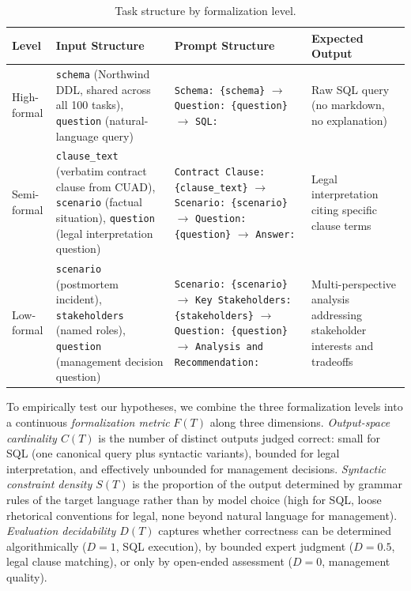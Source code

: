 \documentclass[runningheads]{llncs}
\begin{document}
\begin{table}[t]
\centering
\caption{Task structure by formalization level.}
\label{tab:task-structure}
\scriptsize
\begin{tabular}{
  >{\RaggedRight\arraybackslash}p{1.0cm}
  >{\RaggedRight\arraybackslash}p{4.2cm}
  >{\RaggedRight\arraybackslash}p{4.0cm}
  >{\RaggedRight\arraybackslash}p{2.5cm}
}
\toprule
Level & Input Structure & Prompt Structure & Expected Output \\
\midrule
High-formal &
  \texttt{schema} (Northwind DDL, shared across all 100 tasks), \texttt{question} (natural-language query) &
  \texttt{Schema: \{schema\}} $\rightarrow$ \texttt{Question: \{question\}} $\rightarrow$ \texttt{SQL:} &
  Raw SQL query (no markdown, no explanation) \\
\addlinespace
Semi-formal &
  \texttt{clause\_text} (verbatim contract clause from CUAD), \texttt{scenario} (factual situation), \texttt{question} (legal interpretation question) &
  \texttt{Contract Clause: \{clause\_text\}} $\rightarrow$ \texttt{Scenario: \{scenario\}} $\rightarrow$ \texttt{Question: \{question\}} $\rightarrow$ \texttt{Answer:} &
  Legal interpretation citing specific clause terms \\
\addlinespace
Low-formal &
  \texttt{scenario} (postmortem incident), \texttt{stakeholders} (named roles), \texttt{question} (management decision question) &
  \texttt{Scenario: \{scenario\}} $\rightarrow$ \texttt{Key Stakeholders: \{stakeholders\}} $\rightarrow$ \texttt{Question: \{question\}} $\rightarrow$ \texttt{Analysis and Recommendation:} &
  Multi-perspective analysis addressing stakeholder interests and tradeoffs \\
\bottomrule
\end{tabular}
\end{table}



To empirically test our hypotheses,
we combine the three formalization levels into a continuous \textit{formalization metric} $F(T)$ along three dimensions. \textit{Output-space cardinality $C(T)$} is the number of distinct outputs judged correct: small for SQL (one canonical query plus syntactic variants), bounded for legal interpretation, and effectively unbounded for management decisions. \textit{Syntactic constraint density $S(T)$} is the proportion of the output determined by grammar rules of the target language rather than by model choice (high for SQL, loose rhetorical conventions for legal, none beyond natural language for management). \textit{Evaluation decidability $D(T)$} captures whether correctness can be determined algorithmically ($D{=}1$, SQL execution), by bounded expert judgment ($D{=}0.5$, legal clause matching), or only by open-ended assessment ($D{=}0$, management quality).
\end{document}
